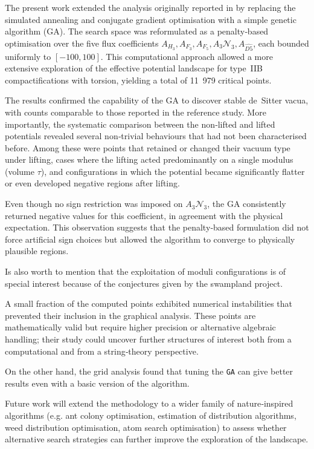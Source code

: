 \documentclass[runningheads]{llncs}
\begin{document}
The present work extended the analysis originally reported in
\cite{Damian2022} by replacing the simulated annealing and
conjugate gradient optimisation with a simple genetic algorithm
(GA). The search space was reformulated as a penalty‑based
optimisation over the five flux coefficients
\(A_{H_3},A_{F_3},A_{F_5},A_3\mathcal{N}_3,A_{\widehat{D5}}\),
each bounded uniformly to \([-100,100]\). This computational
approach allowed a more extensive exploration of the effective
potential landscape for type~IIB compactifications with torsion,
yielding a total of 11~979 critical points.

The results confirmed the capability of the GA to discover
stable de~Sitter vacua, with counts comparable to those
reported in the reference study. More importantly, the
systematic comparison between the non‑lifted and lifted
potentials revealed several non‑trivial behaviours that had not
been characterised before. Among these were points that
retained or changed their vacuum type under lifting, cases
where the lifting acted predominantly on a single modulus
(volume \(\tau\)), and configurations in which
the potential became significantly flatter or even developed
negative regions after lifting.

Even though no sign restriction was imposed on
\(A_3\mathcal{N}_3\), the GA consistently returned negative
values for this coefficient, in agreement with the physical
expectation. This observation suggests that the penalty‑based
formulation did not force artificial sign choices but allowed
the algorithm to converge to physically plausible regions.

Is also worth to mention that the exploitation of moduli
configurations is of special interest because of the
conjectures given by the swampland project.

A small fraction of the computed points exhibited numerical
instabilities that prevented their inclusion in the graphical
analysis. These points are mathematically valid but require
higher precision or alternative algebraic handling; their study
could uncover further structures of interest both from a
computational and from a string‑theory perspective.

On the other hand, the grid analysis found that tuning the
\texttt{GA} can give better results even with a basic
version of the algorithm.

Future work will extend the methodology to a wider family of
nature‑inspired algorithms (e.g. ant colony optimisation,
estimation of distribution algorithms, weed distribution
optimisation, atom search optimisation) to assess whether
alternative search strategies can further improve the
exploration of the landscape.
\end{document}
